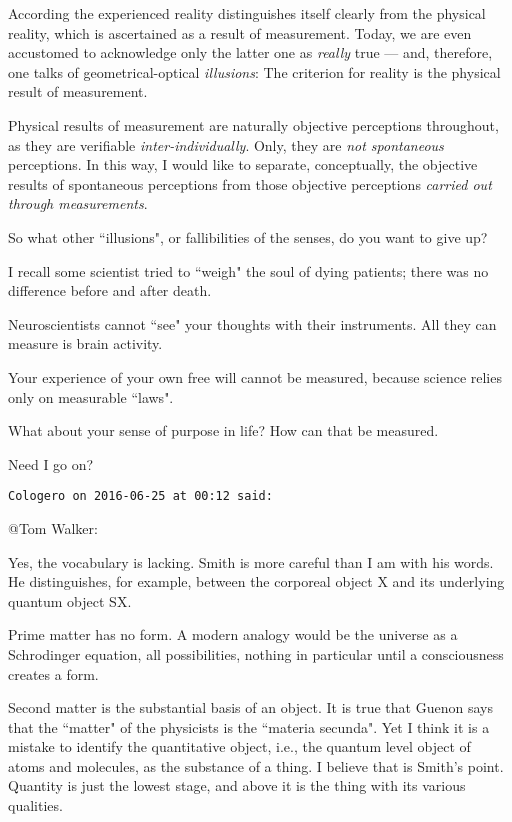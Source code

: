 \begin{footnotesize}
\begin{sffamily}
\begin{quotex}
According the experienced reality distinguishes itself clearly from the physical reality, which is ascertained as a result of measurement. Today, we are even accustomed to acknowledge only the latter one as \emph{really} true — and, therefore, one talks of geometrical-optical \emph{illusions}: The criterion for reality is the physical result of measurement.

Physical results of measurement are naturally objective perceptions throughout, as they are verifiable \emph{inter-individually}. Only, they are \emph{not spontaneous} perceptions. In this way, I would like to separate, conceptually, the objective results of spontaneous perceptions from those objective perceptions \emph{carried out through measurements}. 

\end{quotex}
So what other ``illusions", or fallibilities of the senses, do you want to give up?

I recall some scientist tried to ``weigh" the soul of dying patients; there was no difference before and after death.

Neuroscientists cannot ``see" your thoughts with their instruments. All they can measure is brain activity.

Your experience of your own free will cannot be measured, because science relies only on measurable ``laws".

What about your sense of purpose in life? How can that be measured.

Need I go on?


\hfill

\texttt{Cologero on 2016-06-25 at 00:12 said: }

@Tom Walker:

Yes, the vocabulary is lacking. Smith is more careful than I am with his words. He distinguishes, for example, between the corporeal object X and its underlying quantum object SX.

Prime matter has no form. A modern analogy would be the universe as a Schrodinger equation, all possibilities, nothing in particular until a consciousness creates a form.

Second matter is the substantial basis of an object. It is true that Guenon says that the ``matter" of the physicists is the ``materia secunda". Yet I think it is a mistake to identify the quantitative object, i.e., the quantum level object of atoms and molecules, as the substance of a thing. I believe that is Smith's point. Quantity is just the lowest stage, and above it is the thing with its various qualities.


\end{sffamily}\end{footnotesize}
